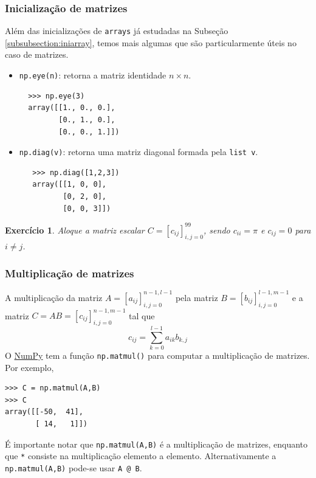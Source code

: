\documentclass[12pt]{article}
\newtheorem{exr}{Exercício}[section]
\begin{document}
\subsubsection{Inicialização de matrizes}

Além das inicializações de \lstinline+arrays+ já estudadas na Subseção \ref{subsubsection:iniarray}, temos mais algumas que são particularmente úteis no caso de matrizes.
\begin{itemize}
\item \lstinline+np.eye(n)+: retorna a matriz identidade $n\times n$.
  \begin{lstlisting}
  >>> np.eye(3)
  array([[1., 0., 0.],
         [0., 1., 0.],
         [0., 0., 1.]])
   \end{lstlisting}
 \item \lstinline+np.diag(v)+: retorna uma matriz diagonal formada pela \lstinline+list v+.
   \begin{lstlisting}
   >>> np.diag([1,2,3])
   array([[1, 0, 0],
          [0, 2, 0],
          [0, 0, 3]])
   \end{lstlisting}
 \end{itemize}

 \begin{exr}
   Aloque a matriz escalar $C = [c_{ij}]_{i,j=0}^{99}$, sendo $c_{ii}=\pi$ e $c_{ij}=0$ para $i\neq j$.
 \end{exr}

\subsubsection{Multiplicação de matrizes}

A multiplicação da matriz $A = [a_{ij}]_{i,j=0}^{n-1,l-1}$ pela matriz $B = [b_{ij}]_{i,j=0}^{l-1,m-1}$ e a matriz $C = AB = [c_{ij}]_{i,j=0}^{n-1,m-1}$ tal que
\begin{equation}
  c_{ij} = \sum_{k=0}^{l-1} a_{ik}b_{k,j}
\end{equation}
O \href{https://numpy.org/}{NumPy} tem a função \lstinline+np.matmul()+ para computar a multiplicação de matrizes. Por exemplo,
\begin{lstlisting}
>>> C = np.matmul(A,B)
>>> C
array([[-50,  41],
       [ 14,   1]])
\end{lstlisting}

\begin{obs}
  É importante notar que \lstinline+np.matmul(A,B)+ é a multiplicação de matrizes, enquanto que \lstinline+*+ consiste na multiplicação elemento a elemento. Alternativamente a \lstinline+np.matmul(A,B)+ pode-se usar \lstinline+A @ B+.
\end{obs}
\end{document}
